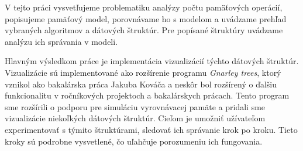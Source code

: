 V tejto práci vysvetľujeme problematiku analýzy počtu pamäťových operácií, popisujeme \obliv pamäťový model, porovnávame ho s \aware modelom a uvádzame prehľad vybraných algoritmov a dátových štruktúr. Pre popísané štruktúry uvádzame analýzu ich správania v \obliv modeli.

Hlavným výsledkom práce je implementácia vizualizácií týchto dátových štruktúr. Vizualizácie sú implementované ako rozšírenie programu {\em Gnarley trees}, ktorý vznikol ako bakalárska práca Jakuba Kováča a neskôr bol rozšírený o ďalšiu funkcionalitu v ročníkových projektoch a bakalárskych prácach. Tento program sme rozšírili o podporu pre simuláciu vyrovnávacej pamäte a pridali sme vizualizácie niekoľkých \obliv dátových štruktúr. Cieľom je umožniť užívateľom experimentovať s týmito štruktúrami, sledovať ich správanie krok po kroku. Tieto kroky sú podrobne vysvetlené, čo uľahčuje porozumeniu ich fungovania. 